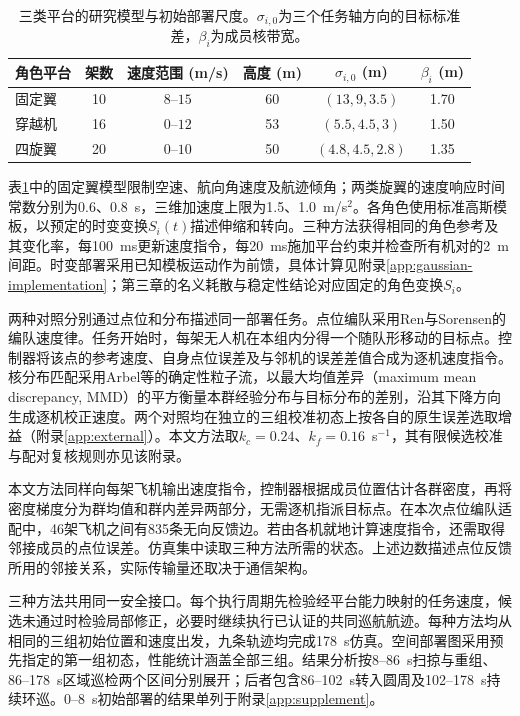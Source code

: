 \documentclass[UTF8,a4paper,11pt,fontset=none]{ctexart}
\begin{document}
\begin{table}[htbp]\centering\small
\caption{三类平台的研究模型与初始部署尺度。$\sigma_{i,0}$为三个任务轴方向的目标标准差，$\beta_i$为成员核带宽。}\label{tab:platforms}
\begin{tabular}{lccccc}\toprule
角色平台 & 架数 & 速度范围 (m/s) & 高度 (m) & $\sigma_{i,0}$ (m) & $\beta_i$ (m)\\\midrule
固定翼 & 10 & $8$--$15$ & 60 & $(13,9,3.5)$ & 1.70\\
穿越机 & 16 & $0$--$12$ & 53 & $(5.5,4.5,3)$ & 1.50\\
四旋翼 & 20 & $0$--$10$ & 50 & $(4.8,4.5,2.8)$ & 1.35\\\bottomrule
\end{tabular}\end{table}

表\ref{tab:platforms}中的固定翼模型限制空速、航向角速度及航迹倾角；两类旋翼的速度响应时间常数分别为0.6、0.8~s，三维加速度上限为1.5、1.0~m/s$^2$。各角色使用标准高斯模板，以预定的时变变换$S_i(t)$描述伸缩和转向。三种方法获得相同的角色参考及其变化率，每100~ms更新速度指令，每20~ms施加平台约束并检查所有机对的2~m间距。时变部署采用已知模板运动作为前馈，具体计算见附录\ref{app:gaussian-implementation}；第三章的名义耗散与稳定性结论对应固定的角色变换$S_i$。

两种对照分别通过点位和分布描述同一部署任务。点位编队采用Ren与Sorensen的编队速度律\cite{ren2008}。任务开始时，每架无人机在本组内分得一个随队形移动的目标点。控制器将该点的参考速度、自身点位误差及与邻机的误差差值合成为逐机速度指令。核分布匹配采用Arbel等的确定性粒子流\cite{arbel2019}，以最大均值差异（maximum mean discrepancy, MMD）的平方衡量本群经验分布与目标分布的差别，沿其下降方向生成逐机校正速度。两个对照均在独立的三组校准初态上按各自的原生误差选取增益（附录\ref{app:external}）。本文方法取$k_c=0.24$、$k_f=0.16$~s$^{-1}$，其有限候选校准与配对复核规则亦见该附录。

本文方法同样向每架飞机输出速度指令，控制器根据成员位置估计各群密度，再将密度梯度分为群均值和群内差异两部分，无需逐机指派目标点。在本次点位编队适配中，46架飞机之间有835条无向反馈边。若由各机就地计算速度指令，还需取得邻接成员的点位误差。仿真集中读取三种方法所需的状态。上述边数描述点位反馈所用的邻接关系，实际传输量还取决于通信架构。

三种方法共用同一安全接口。每个执行周期先检验经平台能力映射的任务速度，候选未通过时检验局部修正，必要时继续执行已认证的共同巡航航迹。每种方法均从相同的三组初始位置和速度出发，九条轨迹均完成178~s仿真。空间部署图采用预先指定的第一组初态，性能统计涵盖全部三组。结果分析按8--86~s扫掠与重组、86--178~s区域巡检两个区间分别展开；后者包含86--102~s转入圆周及102--178~s持续环巡。0--8~s初始部署的结果单列于附录\ref{app:supplement}。
\end{document}

